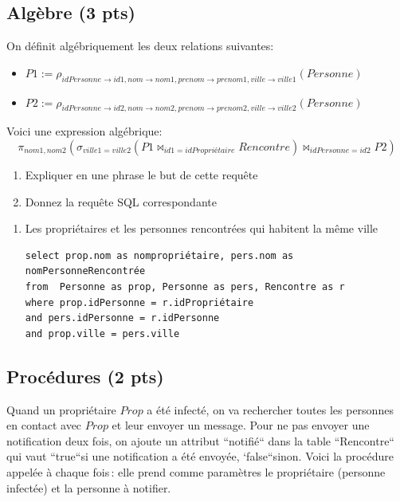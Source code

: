\subsection*{Algèbre (3 pts)}

On définit algébriquement les deux relations suivantes:

\begin{itemize}
  \item $P1 := \rho_{idPersonne \to id1, nom \to nom1, prenom \to prenom1, ville \to ville1} (Personne)$
  \item $P2 := \rho_{idPersonne \to id2, nom \to nom2, prenom \to prenom2, ville \to ville2} (Personne)$
\end{itemize}

Voici une expression algébrique:
$$\pi_{nom1, nom2} (\sigma_{ville1=ville2} (P1 \Join_{id1=idPropriétaire} Rencontre) \Join_{idPersonne=id2} P2)$$

\begin{enumerate}
  \item Expliquer en une phrase le but de cette requête
    \item Donnez la requête SQL correspondante
\end{enumerate}


\begin{solution}

\begin{enumerate}
  \item Les propriétaires et les personnes rencontrées qui habitent la même ville
  \begin{verbatim}
select prop.nom as nompropriétaire, pers.nom as nomPersonneRencontrée 
from  Personne as prop, Personne as pers, Rencontre as r
where prop.idPersonne = r.idPropriétaire
and pers.idPersonne = r.idPersonne
and prop.ville = pers.ville
\end{verbatim}
\end{enumerate}

\end{solution}

\subsection*{Procédures (2 pts)}

Quand un propriétaire $Prop$  a été infecté, on va rechercher toutes les personnes
en contact avec $Prop$ et leur envoyer un message. Pour ne pas envoyer une
notification deux fois, on ajoute un attribut ``notifié`` dans la table ``Rencontre``
qui vaut ``true``si une notification a été envoyée, `false``sinon. 
Voici la procédure appelée à chaque fois\,: elle prend comme paramètres le propriétaire
(personne infectée)
et la personne à notifier.

